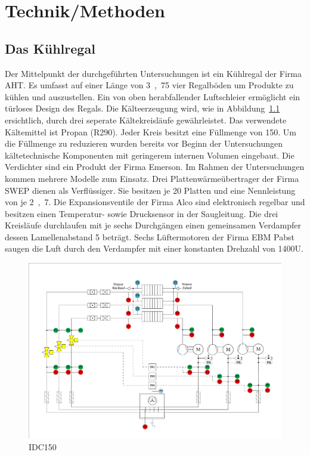 \chapter{Technik/Methoden}
\label{cha:Technik}

\section{Das Kühlregal}
\label{sec:Das Kühlregal}

Der Mittelpunkt der durchgeführten Untersuchungen ist ein Kühlregal der Firma AHT.
Es umfasst auf einer Länge von \unit{3,75}{\metre} vier Regalböden um Produkte zu kühlen und auszustellen. Ein von oben herabfallender Luftschleier ermöglicht ein türloses Design des Regals. Die Kälteerzeugung wird, wie in Abbildung~\ref{fig:IDC150} ersichtlich, durch drei seperate Kältekreisläufe gewährleistet. Das verwendete Kältemittel ist Propan (R290). Jeder Kreis besitzt eine Füllmenge von \unit{150}{\gram}. Um die Füllmenge zu reduzieren wurden bereits vor Beginn der Untersuchungen kältetechnische Komponenten mit geringerem internen Volumen eingebaut. Die Verdichter sind ein Produkt der Firma Emerson. Im Rahmen der Untersuchungen kommen mehrere Modelle zum Einsatz. Drei Plattenwärmeübertrager der Firma SWEP dienen als Verflüssiger. Sie besitzen je 20 Platten und eine Nennleistung von je \unit{2,7}{\kilo\watt}. Die Expansionsventile der Firma Alco sind elektronisch regelbar und besitzen einen Temperatur- sowie Drucksensor in der Saugleitung. Die drei Kreisläufe durchlaufen mit je sechs Durchgängen einen gemeinsamen Verdampfer dessen Lamellenabstand \unit{5}{\milli\metre} beträgt. Sechs Lüftermotoren der Firma EBM Pabst saugen die Luft durch den Verdampfer mit einer konstanten Drehzahl von \unit{1400}{U\per\min}.

\begin{figure} %
\centering
\includegraphics[scale=.5,angle=90]{Pictures/IDC150.pdf}
\caption{IDC150}
\label{fig:IDC150}
\end{figure}


